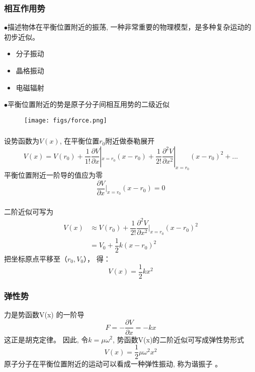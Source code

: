 \begin{frame}
  \frametitle{相互作用势}
  $\bullet$\emf[简谐振动：]描述物体在平衡位置附近的振荡, 一种非常重要的物理模型，是多种复杂运动的初步近似。
  \begin{itemize}
    \item 分子振动
    \item 晶格振动
    \item 电磁辐射 
  \end{itemize}
  $\bullet$\emf[相互作用势:]平衡位置附近的势是原子分子间相互用势的二级近似
  \begin{figure}[h]
    \centering
    \texttt{[image: figs/force.png]}
\end{figure}
\end{frame} 

\begin{frame} 
	\frametitle{}
	\解 设势函数为$V(x)$, 在平衡位置$r_0$附近做泰勒展开 
\begin{equation*}
	V(x)=V(r_0) +\frac{1}{1!} \frac{\partial V}{\partial x} |_{x=r_0} (x-r_0) +\frac{1}{2!} \frac{\partial ^2 V}{\partial x ^2} |_{x=r_0} (x-r_0) ^2 + ... 
\end{equation*}
平衡位置附近一阶导的值应为零
\[\frac{\partial V}{\partial x} |_{x=r_0} (x-r_0) =0 \]
\end{frame}

\begin{frame}
	\frametitle{}
	二阶近似可写为 \\
	$$\begin{aligned}
		V(x) &\approx V(r_0)+\dfrac{1}{2!} \dfrac{\partial ^2 V}{\partial x ^2} |_{x=r_0} (x-r_0) ^2   \\
		& =V_0+\dfrac{1}{2} k (x-r_0) ^2 
	\end{aligned}$$
	把坐标原点平移至（$r_0, V_0 $）， 得：\\
	\begin{equation*}
		V(x)=\dfrac{1}{2} k x^2 
	\end{equation*}	
\end{frame}

\begin{frame}
	\frametitle{弹性势}
	力是势函数V(x) 的一阶导\\
	\begin{equation*}
		F=-\frac{ \partial V}{\partial x}=-kx 
	\end{equation*}	
	这正是胡克定律。 因此, 令$k= \mu \omega ^2$, 势函数V(x)的二阶近似可写成弹性势形式\\
	\begin{equation*}
		V(x)=\dfrac{1}{2} \mu \omega ^2 x^2 
	\end{equation*}
	原子分子在平衡位置附近的运动可以看成一种弹性振动, 称为谐振子 。
\end{frame}	

